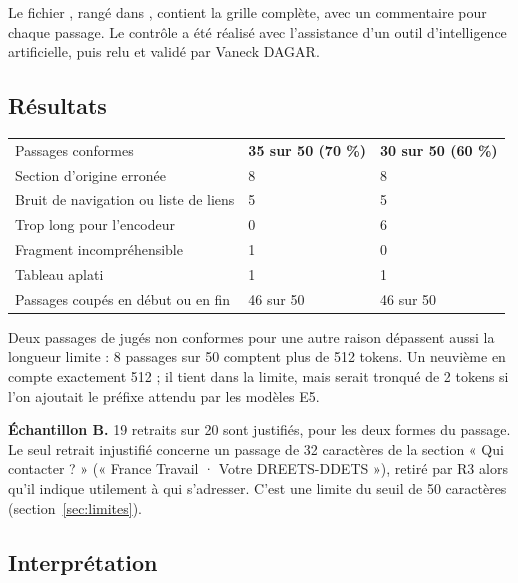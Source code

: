 Le fichier , rangé dans , contient la grille
complète, avec un commentaire pour chaque passage. Le contrôle a été réalisé avec l'assistance
d'un outil d'intelligence artificielle, puis relu et validé par Vaneck DAGAR.

\subsection{Résultats}

\begin{tabletype}
\begin{tabularx}{\textwidth}{@{}Y L{2.6cm}L{2.6cm}@{}}
\toprule
{} &  &  \\
\midrule
Passages conformes & \textbf{35 sur 50 (70 \%)} & \textbf{30 sur 50 (60 \%)} \\
Section d'origine erronée & 8 & 8 \\
Bruit de navigation ou liste de liens & 5 & 5 \\
Trop long pour l'encodeur & 0 & 6 \\
Fragment incompréhensible & 1 & 0 \\
Tableau aplati & 1 & 1 \\
\midrule
Passages coupés en début ou en fin & 46 sur 50 & 46 sur 50 \\
\bottomrule
\end{tabularx}
\end{tabletype}

Deux passages de  jugés non conformes pour une autre raison dépassent aussi la
longueur limite : 8 passages sur 50 comptent plus de 512 tokens. Un neuvième en compte exactement 512 ;
il tient dans la limite, mais serait tronqué de 2 tokens si l'on ajoutait le préfixe 
attendu par les modèles E5.

\textbf{Échantillon B.} 19 retraits sur 20 sont justifiés, pour les deux formes du passage. Le seul
retrait injustifié concerne un passage de 32 caractères de la section « Qui contacter ? »
(« France Travail · Votre DREETS-DDETS »), retiré par R3 alors qu'il indique utilement à qui
s'adresser. C'est une limite du seuil de 50 caractères (section~\ref{sec:limites}).

\subsection{Interprétation}

